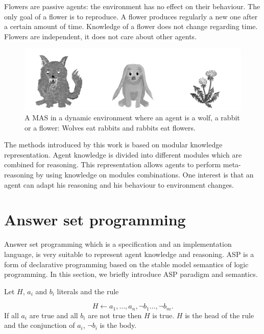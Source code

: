 \documentclass{aamas2012}
\begin{document}
	Flowers are passive agents: the environment has no effect on their behaviour.
	The only goal of a flower is to reproduce.
	A flower produces regularly a new one after a certain amount of time.
	Knowledge of a flower does not change regarding time.
	Flowers are independent, it does not care about other agents.

	\begin{figure}
		\centering
		\includegraphics[keepaspectratio=true,scale=3.0]{food_chain.png}
		\caption
		{
			\label{food_chain}
			A MAS in a dynamic environment where an agent is a wolf, a rabbit or a flower:
			Wolves eat rabbits and rabbits eat flowers.
		}
	\end{figure}
	
	The methods introduced by this work is based on modular knowledge representation.
	Agent knowledge is divided into different modules which are combined for reasoning.
	This representation allows agents to perform meta-reasoning by using knowledge on modules combinations.
	One interest is that an agent can adapt his reasoning and his behaviour to environment changes.

\section{Answer set programming}

	Answer set programming which is a specification and an implementation language, is very suitable to represent agent knowledge and reasoning.
	ASP is a form of declarative programming based on the stable model semantics of logic programming.
	In this section, we briefly introduce ASP paradigm and semantics.

	\begin{definition}[Rule]
		Let $H$, $a_{i}$ and $b_{i}$ literals and the rule
	
					$$H \leftarrow a_{1}, \ldots , a_{n}, \neg b_{1} \ldots, \neg b_{m}.$$
		If all $a_{i}$ are true and all $b_{i}$ are not true then $H$ is true.
		$H$ is the head of the rule and the conjunction of $a_{i}$, $\neg b_{i}$ is the body.
	\end{definition}
\end{document}
